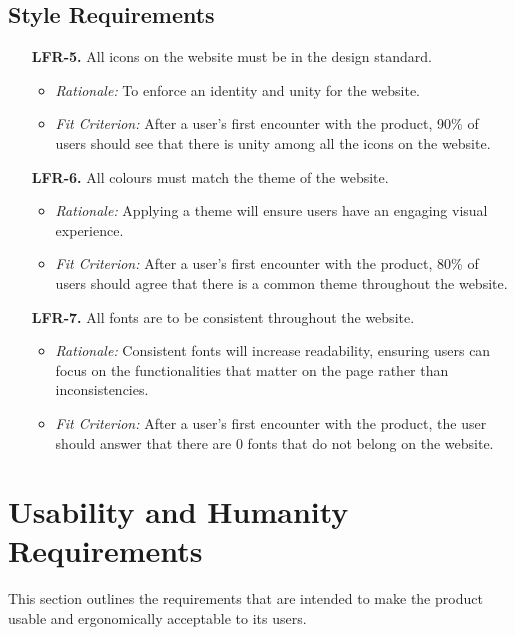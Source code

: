 \documentclass[12pt]{article}
\begin{document}
\subsection{Style Requirements}
\begin{enumerate}
  \item[\textbf{LFR-5.}] All icons on the website must be in the design standard. 
  \begin{itemize}
    \item \textit{Rationale:} To enforce an identity and unity for the website. 
    \item \textit{Fit Criterion:} After a user's first encounter with the product, 90\% of users should
    see that there is unity among all the icons on the website. 
  \end{itemize}
  
  \item[\textbf{LFR-6.}] All colours must match the theme of the website.
  \begin{itemize}
    \item \textit{Rationale:} Applying a theme will ensure users have
    an engaging visual experience.
    \item \textit{Fit Criterion:} After a user's first encounter with the product, 80\% of users
    should agree that there is a common theme throughout the website.
  \end{itemize}
  
  \item[\textbf{LFR-7.}] All fonts are to be consistent throughout the website. 
  \begin{itemize}
    \item \textit{Rationale:} Consistent fonts will increase readability,
    ensuring users can focus on the functionalities that matter on the page rather than inconsistencies. 
    \item \textit{Fit Criterion:} After a user's first encounter with the
    product, the user should answer that there are 0 fonts that do not belong on the
    website. 
  \end{itemize}
\end{enumerate}

\section{Usability and Humanity Requirements}
This section outlines the requirements that are intended to make the product usable and ergonomically acceptable to its users.
\end{document}
